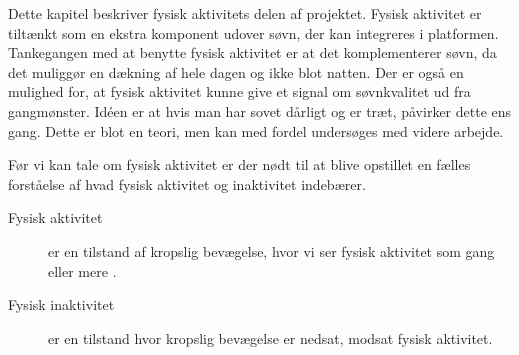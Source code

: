 Dette kapitel beskriver fysisk aktivitets delen af projektet.
Fysisk aktivitet er tiltænkt som en ekstra komponent udover søvn, der kan integreres i platformen.
Tankegangen med at benytte fysisk aktivitet er at det komplementerer søvn, da det muliggør en dækning af hele dagen og ikke blot natten.
Der er også en mulighed for, at fysisk aktivitet kunne give et signal om søvnkvalitet ud fra gangmønster.
Idéen er at hvis man har sovet dårligt og er træt, påvirker dette ens gang.
Dette er blot en teori, men kan med fordel undersøges med videre arbejde.

Før vi kan tale om fysisk aktivitet er der nødt til at blive opstillet en fælles forståelse af hvad fysisk aktivitet og inaktivitet indebærer.
\begin{description}
\item[Fysisk aktivitet] er en tilstand af kropslig bevægelse, hvor vi ser fysisk aktivitet som gang eller mere \citep{misc:PhysicalActivity}.
\item[Fysisk inaktivitet] er en tilstand hvor kropslig bevægelse er nedsat, modsat fysisk aktivitet.
\end{description}